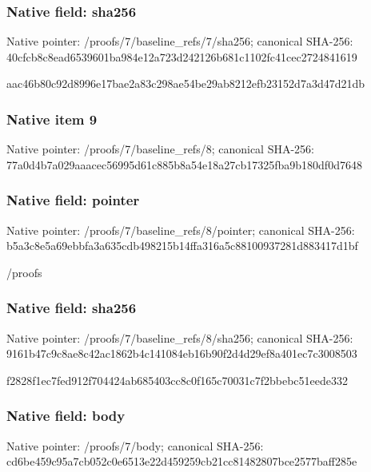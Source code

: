 \documentclass[10pt,a4paper]{article}
\begin{document}
\subsubsection{Native field: sha256}
Native pointer: /proofs/7/baseline\_\allowbreak{}refs/7/sha256; canonical SHA-256: 40cfcb8c8ead6539601ba984e12a723d242126b681c1102fc41cec2724841619

\begingroup\raggedright\sloppy aac46b80c92d8996e17bae2a83c298ae54be29ab8212efb23152d7a3d47d21db\par\endgroup

\subsubsection{Native item 9}
Native pointer: /proofs/7/baseline\_\allowbreak{}refs/8; canonical SHA-256: 77a0d4b7a029aaacec56995d61c885b8a54e18a27cb17325fba9b180df0d7648

\subsubsection{Native field: pointer}
Native pointer: /proofs/7/baseline\_\allowbreak{}refs/8/pointer; canonical SHA-256: b5a3c8e5a69ebbfa3a635cdb498215b14ffa316a5c88100937281d883417d1bf

\begingroup\raggedright\sloppy /\allowbreak{}proofs\par\endgroup

\subsubsection{Native field: sha256}
Native pointer: /proofs/7/baseline\_\allowbreak{}refs/8/sha256; canonical SHA-256: 9161b47c9c8ae8c42ac1862b4c141084eb16b90f2d4d29ef8a401ec7c3008503

\begingroup\raggedright\sloppy f2828f1ec7fed912f704424ab685403cc8c0f165c70031c7f2bbebc51eede332\par\endgroup

\subsubsection{Native field: body}
Native pointer: /proofs/7/body; canonical SHA-256: cd6be459c95a7cb052c0e6513e22d459259cb21cc81482807bce2577baff285e
\end{document}

